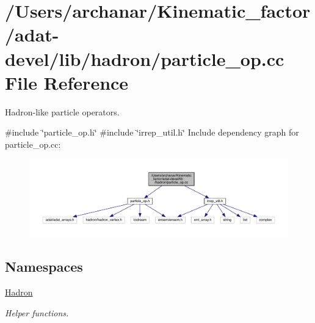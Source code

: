 \hypertarget{adat-devel_2lib_2hadron_2particle__op_8cc}{}\section{/\+Users/archanar/\+Kinematic\+\_\+factor/adat-\/devel/lib/hadron/particle\+\_\+op.cc File Reference}
\label{adat-devel_2lib_2hadron_2particle__op_8cc}


Hadron-\/like particle operators.  


{\ttfamily \#include \char`\"{}particle\+\_\+op.\+h\char`\"{}}\newline
{\ttfamily \#include \char`\"{}irrep\+\_\+util.\+h\char`\"{}}\newline
Include dependency graph for particle\+\_\+op.\+cc\+:
\nopagebreak
\begin{figure}[H]
\begin{center}
\leavevmode
\includegraphics[width=350pt]{d4/d68/adat-devel_2lib_2hadron_2particle__op_8cc__incl}
\end{center}
\end{figure}
\subsection*{Namespaces}
\begin{DoxyCompactItemize}
\item 
 \mbox{\hyperlink{namespaceHadron}{Hadron}}
\begin{DoxyCompactList}\small\item\em Helper functions. \end{DoxyCompactList}\end{DoxyCompactItemize}
